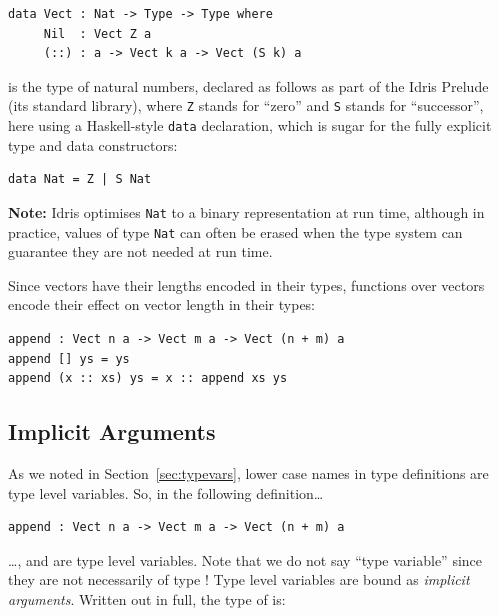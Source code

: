 \begin{lstlisting}
data Vect : Nat -> Type -> Type where
     Nil  : Vect Z a
     (::) : a -> Vect k a -> Vect (S k) a
\end{lstlisting}

 is the type of natural numbers, declared as follows as part of the
Idris Prelude (its standard library), where \texttt{Z} stands for ``zero'' and
\texttt{S} stands for ``successor'', here using a Haskell-style \texttt{data}
declaration, which is sugar for the fully explicit type and data constructors:

\begin{lstlisting}
data Nat = Z | S Nat
\end{lstlisting}

\textbf{Note:}
Idris
optimises \texttt{Nat} to a binary representation at run time, although
in practice, values of type \texttt{Nat} can often be erased when the
type system can guarantee they are not needed at run time.

Since vectors have their lengths encoded in their types, functions over vectors
encode their effect on vector length in their types:

\begin{lstlisting}
append : Vect n a -> Vect m a -> Vect (n + m) a
append [] ys = ys
append (x :: xs) ys = x :: append xs ys
\end{lstlisting}


\subsection{Implicit Arguments}

\label{sec:implicits}

As we noted in Section~\ref{sec:typevars}, lower case names in type definitions
are type level variables. So, in the following definition\ldots

\begin{lstlisting}
append : Vect n a -> Vect m a -> Vect (n + m) a
\end{lstlisting}

\ldots {},  and  are type level variables. Note that we do not
say ``type variable'' since they are not necessarily of type !
Type level variables are bound as \emph{implicit arguments}. Written
out in full, the type of  is:

